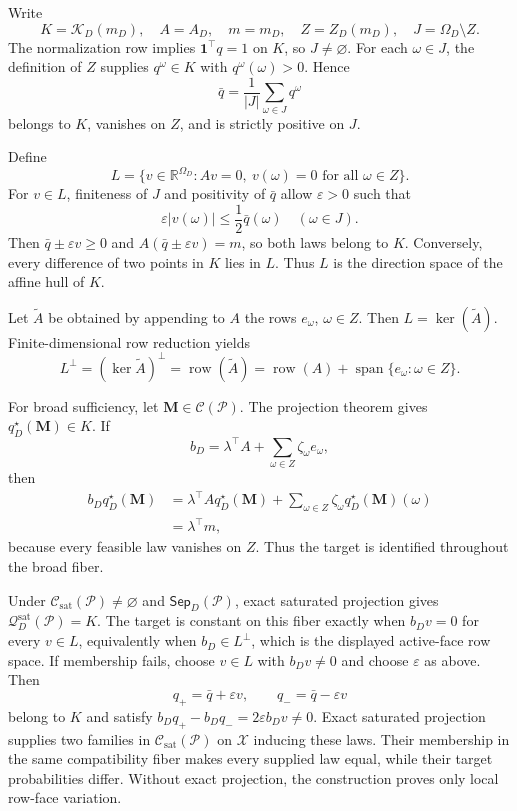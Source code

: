 Write
\[
K=\mathcal K_D(m_D),\quad A=A_D,\quad m=m_D,
\quad Z=Z_D(m_D),\quad J=\Omega_D\setminus Z.
\]
The normalization row implies \(\mathbf 1^\top q=1\) on \(K\), so \(J\ne\varnothing\). For each \(\omega\in J\), the definition of \(Z\) supplies \(q^\omega\in K\) with \(q^\omega(\omega)>0\). Hence
\[
\bar q=\frac1{|J|}\sum_{\omega\in J}q^\omega
\]
belongs to \(K\), vanishes on \(Z\), and is strictly positive on \(J\).

Define
\[
L=\{v\in\mathbb R^{\Omega_D}:Av=0,\ v(\omega)=0\text{ for all }\omega\in Z\}.
\]
For \(v\in L\), finiteness of \(J\) and positivity of \(\bar q\) allow \(\varepsilon>0\) such that
\[
\varepsilon |v(\omega)|\leq \frac12\bar q(\omega)
\quad(\omega\in J).
\]
Then \(\bar q\pm\varepsilon v\geq0\) and \(A(\bar q\pm\varepsilon v)=m\), so both laws belong to \(K\). Conversely, every difference of two points in \(K\) lies in \(L\). Thus \(L\) is the direction space of the affine hull of \(K\).

Let \(\widetilde A\) be obtained by appending to \(A\) the rows \(e_\omega\), \(\omega\in Z\). Then \(L=\ker(\widetilde A)\). Finite-dimensional row reduction yields
\[
L^\perp=(\ker\widetilde A)^\perp
=\operatorname{row}(\widetilde A)
=\operatorname{row}(A)+\operatorname{span}\{e_\omega:\omega\in Z\}.
\]

For broad sufficiency, let \(\mathbf M\in\mathcal C(\mathcal P)\). The projection theorem gives \(q_D^\star(\mathbf M)\in K\). If
\[
b_D=\lambda^\top A+\sum_{\omega\in Z}\zeta_\omega e_\omega,
\]
then
\[
\begin{aligned}
b_Dq_D^\star(\mathbf M)
&=\lambda^\top A q_D^\star(\mathbf M)
+\sum_{\omega\in Z}\zeta_\omega q_D^\star(\mathbf M)(\omega)\\
&=\lambda^\top m,
\end{aligned}
\]
because every feasible law vanishes on \(Z\). Thus the target is identified throughout the broad fiber.

Under \(\mathcal C_{\mathrm{sat}}(\mathcal P)\ne\varnothing\) and \(\mathsf{Sep}_D(\mathcal P)\), exact saturated projection gives \(\mathcal Q_D^{\mathrm{sat}}(\mathcal P)=K\). The target is constant on this fiber exactly when \(b_Dv=0\) for every \(v\in L\), equivalently when \(b_D\in L^\perp\), which is the displayed active-face row space. If membership fails, choose \(v\in L\) with \(b_Dv\ne0\) and choose \(\varepsilon\) as above. Then
\[
q_+=\bar q+\varepsilon v,
\qquad q_-=\bar q-\varepsilon v
\]
belong to \(K\) and satisfy \(b_Dq_+-b_Dq_-=2\varepsilon b_Dv\ne0\). Exact saturated projection supplies two families in \(\mathcal C_{\mathrm{sat}}(\mathcal P)\) on \(\mathcal X\) inducing these laws. Their membership in the same compatibility fiber makes every supplied law equal, while their target probabilities differ. Without exact projection, the construction proves only local row-face variation.